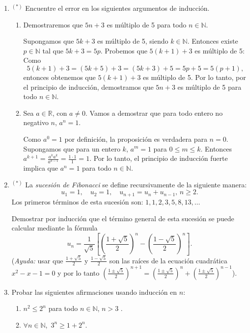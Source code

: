 \documentclass[a4paper,12pt,twoside,spanish,reqno]{amsbook}
\numberwithin{equation}{section}
\begin{document}
\begin{enumerate}[resume]
\item${}^{(*)}$ Encuentre el error en los siguientes argumentos de inducción.
\begin{enumerate}
\item  Demostraremos que $5n+3$ es múltiplo de 5 para todo $n\in \mathbb N$.

Supongamos que $5k+3$ es múltiplo de 5, siendo $k\in \mathbb N$. Entonces existe
$p\in \mathbb N$ tal que  $5k+3=5p$. Probemos que $5(k+1)+3$ es múltiplo de 5:
Como
$$
5(k+1)+3=(5k+5)+3=(5k+3)+5=5p+5=5(p+1),
$$
entonces obtenemos que $5(k+1)+3$ es múltiplo de 5. Por lo tanto, por el principio
de inducción, demostramos que $5n+3$ es múltiplo de 5 para todo $n\in \mathbb
N$.

\item Sea $a\in\mathbb R$, con $a\neq 0$. Vamos a demostrar que para todo entero no negativo $n$, $a^n=1$.

Como $a^0=1$ por definición, la proposición es verdadera para $n=0$. Supongamos
que para  un entero $k$, $a^m=1$ para $0\leq m \leq k$. Entonces
$a^{k+1}= \frac{a^k a^k}{a^{k-1}}=\frac{1\cdot1}1=1$.
Por lo tanto, el principio de inducción fuerte implica que $a^n=1$ para todo $n\in \mathbb N$.
\end{enumerate}

\item${}^{(*)}$ La \emph{sucesión de Fibonacci} se define recursivamente de la siguiente manera:
$$
u_1=1,\quad u_2=1,\quad u_{n+1}=u_{n}+u_{n-1}, \, n\geq 2.
$$
Los primeros términos de esta sucesión son: $1,1,2,3,5,8,13,\ldots$

Demostrar por inducción que el término general de esta sucesión se puede calcular mediante la fórmula
\[ u_n= \frac{1}{\sqrt{5}}\left[\left(\frac{1+\sqrt{5}}{2}\right)^n-\left(\frac{1-\sqrt{5}}{2}\right)^n\right].\]
(\textit{Ayuda:} usar que $\frac{1+\sqrt{5}}{2}$ y $\frac{1-\sqrt{5}}{2}$ son las raíces de la ecuación cuadrática $x^2-x-1=0$ y por lo tanto  $\left(\frac{1\pm\sqrt{5}}{2}\right)^{n+1} = \left(\frac{1\pm\sqrt{5}}{2}\right)^{n}+\left(\frac{1\pm\sqrt{5}}{2}\right)^{n-1}$).

    \item Probar las siguientes afirmaciones usando inducción en $n$:
    \begin{enumerate}
        \item $n^2\leq 2^n$ para todo $n\in{\mathbb N}$, $n>3$ .
        \item $\forall n \in {\mathbb N}$,\ $3^n \ge 1 + 2^n$.
    \end{enumerate}

\end{enumerate}
\end{document}
